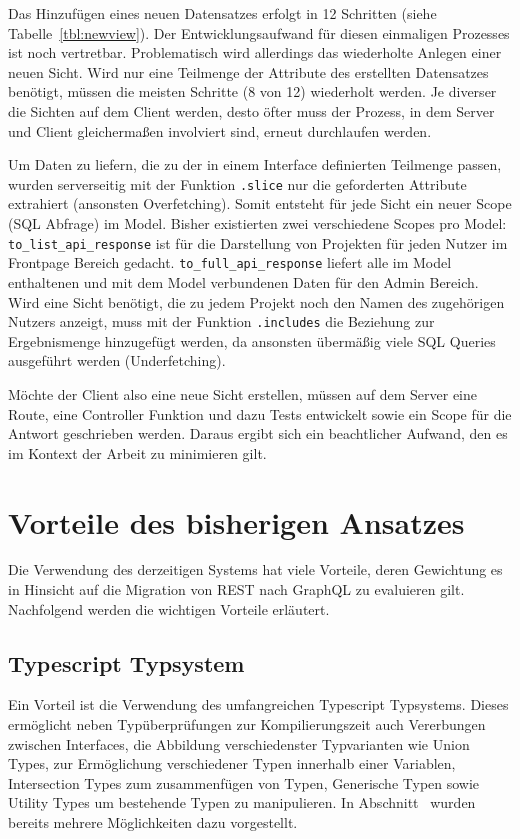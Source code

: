 Das Hinzufügen eines neuen Datensatzes erfolgt in 12 Schritten (siehe Tabelle~\ref{tbl:newview}). Der Entwicklungsaufwand für diesen einmaligen Prozesses ist noch vertretbar. Problematisch wird allerdings das wiederholte Anlegen einer neuen Sicht. Wird nur eine Teilmenge der Attribute des erstellten Datensatzes benötigt, müssen die meisten Schritte (8 von 12) wiederholt werden. Je diverser die Sichten auf dem Client werden, desto öfter muss der Prozess, in dem Server und Client gleichermaßen involviert sind, erneut durchlaufen werden.

Um Daten zu liefern, die zu der in einem Interface definierten Teilmenge passen, wurden serverseitig mit der Funktion \texttt{.slice} nur die geforderten Attribute extrahiert (ansonsten Overfetching). Somit entsteht für jede Sicht ein neuer Scope (SQL Abfrage) im Model. Bisher existierten zwei verschiedene Scopes pro Model:
\texttt{to\_list\_api\_response} ist für die Darstellung von Projekten für jeden Nutzer im Frontpage Bereich gedacht.
\texttt{to\_full\_api\_response} liefert alle im Model enthaltenen und mit dem Model verbundenen Daten für den Admin Bereich.
Wird eine Sicht benötigt, die zu jedem Projekt noch den Namen des zugehörigen Nutzers anzeigt, muss mit der Funktion \texttt{.includes} die Beziehung zur Ergebnismenge hinzugefügt werden, da ansonsten übermäßig viele SQL Queries ausgeführt werden (Underfetching).

Möchte der Client also eine neue Sicht erstellen, müssen auf dem Server eine Route, eine Controller Funktion und dazu Tests entwickelt sowie ein Scope für die Antwort geschrieben werden. Daraus ergibt sich ein beachtlicher Aufwand, den es im Kontext der Arbeit zu minimieren gilt.

\section{Vorteile des bisherigen Ansatzes}
\label{sec:requirements:pros}
Die Verwendung des derzeitigen Systems hat viele Vorteile,
deren Gewichtung es in Hinsicht auf die Migration von REST nach GraphQL zu evaluieren gilt.
Nachfolgend werden die wichtigen Vorteile erläutert.

\subsection{Typescript Typsystem}
\label{sec:requirements:pros:typescript}
Ein Vorteil ist die Verwendung des umfangreichen Typescript Typsystems.
Dieses ermöglicht neben Typüberprüfungen zur Kompilierungszeit auch Vererbungen zwischen Interfaces, die Abbildung verschiedenster Typvarianten wie
Union Types, zur Ermöglichung verschiedener Typen innerhalb einer Variablen, Intersection Types zum zusammenfügen von Typen,
Generische Typen sowie Utility Types um bestehende Typen zu manipulieren.
In Abschnitt~ wurden bereits mehrere Möglichkeiten dazu vorgestellt.

